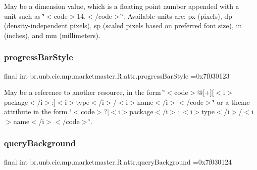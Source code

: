 May be a dimension value, which is a floating point number appended with a unit such as \char`\"{}$<$code$>$14.\+5sp$<$/code$>$\char`\"{}. Available units are\+: px (pixels), dp (density-\/independent pixels), sp (scaled pixels based on preferred font size), in (inches), and mm (millimeters). \mbox{\label{classbr_1_1unb_1_1cic_1_1mp_1_1marketmaster_1_1R_1_1attr_a62eddc1833bde54df1550a29da86c41a}} 
\subsubsection{\texorpdfstring{progress\+Bar\+Style}{progressBarStyle}}
{\footnotesize\ttfamily final int br.\+unb.\+cic.\+mp.\+marketmaster.\+R.\+attr.\+progress\+Bar\+Style =0x7f030123\hspace{0.3cm}{\ttfamily [static]}}

May be a reference to another resource, in the form \char`\"{}$<$code$>$@\mbox{[}+\mbox{]}\mbox{[}$<$i$>$package$<$/i$>$\+:\mbox{]}$<$i$>$type$<$/i$>$/$<$i$>$name$<$/i$>$$<$/code$>$\char`\"{} or a theme attribute in the form \char`\"{}$<$code$>$?\mbox{[}$<$i$>$package$<$/i$>$\+:\mbox{]}$<$i$>$type$<$/i$>$/$<$i$>$name$<$/i$>$$<$/code$>$\char`\"{}. \mbox{\label{classbr_1_1unb_1_1cic_1_1mp_1_1marketmaster_1_1R_1_1attr_a3dfc072d87e7630e3576bb51e1eb50d1}} 
\subsubsection{\texorpdfstring{query\+Background}{queryBackground}}
{\footnotesize\ttfamily final int br.\+unb.\+cic.\+mp.\+marketmaster.\+R.\+attr.\+query\+Background =0x7f030124\hspace{0.3cm}{\ttfamily [static]}}


